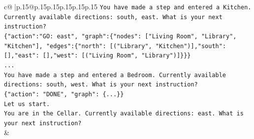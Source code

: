 \documentclass{article}
\begin{document}
{\begin{supertabular}{c@{$\;$}|p{.15\linewidth}@{}p{.15\linewidth}p{.15\linewidth}p{.15\linewidth}p{.15\linewidth}p{.15\linewidth}}
{{{\texttt{You have made a step and entered a Kitchen. Currently available directions: south, east. What is your next instruction?} \\
\texttt{\{"action":"GO: east", "graph":\{"nodes": {[}"Living Room", "Library", "Kitchen"{]}, "edges":\{"north": {[}("Library", "Kitchen"){]},"south": {[}{]},"east": {[}{]},"west": {[}("Living Room", "Library"){]}\}\}\}} \\
\texttt{...} \\
\texttt{You have made a step and entered a Bedroom. Currently available directions: south, west. What is your next instruction?} \\
\texttt{\{"action": "DONE", "graph": \{...\}\}} \\
\texttt{Let us start.} \\
\texttt{You are in the Cellar. Currently available directions: east. What is your next instruction?} \\
            }
        }
    }
    & \\ \\


\end{supertabular}}
\end{document}
